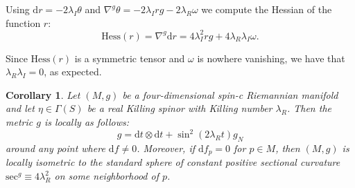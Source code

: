 \documentclass[10pt,a4paper,twoside,reqno]{amsart}
\theoremstyle{plain}
\newtheorem{cor}[thm]{Corollary}
\theoremstyle{definition}
\theoremstyle{remark}
\def\dd{\mathrm{d}}
\def\dd{\mathrm{d}}
\def\Hess{\mathrm{Hess}}
\begin{document}
Using $\dd r=-2\lambda_I\theta$ and $\nabla^g\theta=-2\lambda_Irg-2\lambda_R\omega$ we compute the Hessian of the function $r$: $$\Hess(r)=\nabla^g\dd r=4\lambda_I^2rg+4\lambda_R\lambda_I\omega.$$

Since $\Hess(r)$ is a symmetric tensor and $\omega$ is nowhere vanishing, we have that $\lambda_R\lambda_I=0$, as expected.

\begin{cor}
    Let $(M,g)$ be a four-dimensional spin-c Riemannian manifold and let $\eta\in\Gamma(S)$ be a real Killing spinor with Killing number $\lambda_R$. Then the metric $g$ is locally as follows: $$g=\dd t\otimes\dd t+\sin^2(2\lambda_Rt)g_N$$ around any point where $\dd f\neq0$. Moreover, if $\dd f_p=0$ for $p\in M$, then $(M,g)$ is locally isometric to the standard sphere of constant positive sectional curvature $\mathrm{sec}^g\equiv 4\lambda_R^2$ on some neighborhood of $p$.
\end{cor}
\end{document}
